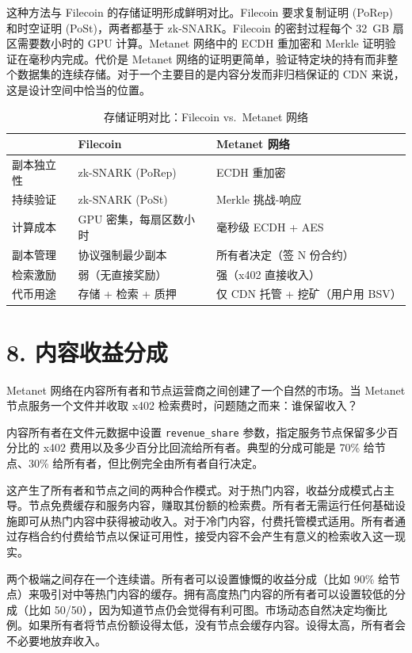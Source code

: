 \documentclass[11pt,a4paper]{article}
\begin{document}
这种方法与 Filecoin 的存储证明形成鲜明对比。Filecoin 要求复制证明 (PoRep) 和时空证明 (PoSt)，两者都基于 zk-SNARK。Filecoin 的密封过程每个 32~GB 扇区需要数小时的 GPU 计算。Metanet 网络中的 ECDH 重加密和 Merkle 证明验证在毫秒内完成。代价是 Metanet 网络的证明更简单，验证特定块的持有而非整个数据集的连续存储。对于一个主要目的是内容分发而非归档保证的 CDN 来说，这是设计空间中恰当的位置。

\begin{table}[htbp]
\centering
\small
\begin{tabularx}{\textwidth}{@{}l >{\raggedright\arraybackslash}X >{\raggedright\arraybackslash}X@{}}
\toprule
 & \textbf{Filecoin} & \textbf{Metanet 网络} \\
\midrule
副本独立性 & zk-SNARK (PoRep) & ECDH 重加密 \\
持续验证 & zk-SNARK (PoSt) & Merkle 挑战-响应 \\
计算成本 & GPU 密集，每扇区数小时 & 毫秒级 ECDH + AES \\
副本管理 & 协议强制最少副本 & 所有者决定（签 N 份合约） \\
检索激励 & 弱（无直接奖励） & 强（x402 直接收入） \\
代币用途 & 存储 + 检索 + 质押 & 仅 CDN 托管 + 挖矿（用户用 BSV） \\
\bottomrule
\end{tabularx}
\caption{存储证明对比：Filecoin vs.\ Metanet 网络}
\end{table}

\section{8. 内容收益分成}

Metanet 网络在内容所有者和节点运营商之间创建了一个自然的市场。当 Metanet 节点服务一个文件并收取 x402 检索费时，问题随之而来：谁保留收入？

内容所有者在文件元数据中设置 \texttt{revenue\_share} 参数，指定服务节点保留多少百分比的 x402 费用以及多少百分比回流给所有者。典型的分成可能是 70\% 给节点、30\% 给所有者，但比例完全由所有者自行决定。

这产生了所有者和节点之间的两种合作模式。对于热门内容，收益分成模式占主导。节点免费缓存和服务内容，赚取其份额的检索费。所有者无需运行任何基础设施即可从热门内容中获得被动收入。对于冷门内容，付费托管模式适用。所有者通过存档合约付费给节点以保证可用性，接受内容不会产生有意义的检索收入这一现实。

两个极端之间存在一个连续谱。所有者可以设置慷慨的收益分成（比如 90\% 给节点）来吸引对中等热门内容的缓存。拥有高度热门内容的所有者可以设置较低的分成（比如 50/50），因为知道节点仍会觉得有利可图。市场动态自然决定均衡比例。如果所有者将节点份额设得太低，没有节点会缓存内容。设得太高，所有者会不必要地放弃收入。
\end{document}

